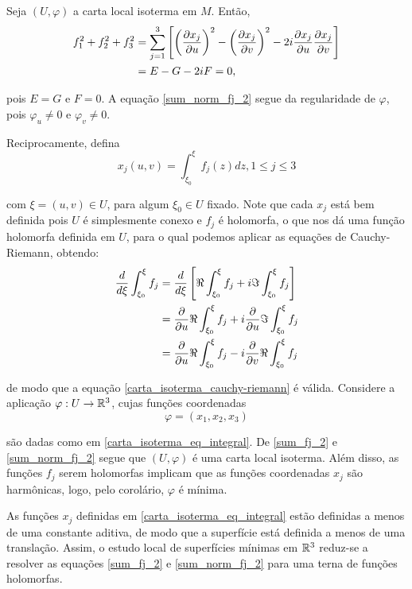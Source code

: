 \begin{demonstracao}
	Seja $(U, \varphi)$ a carta local isoterma em $M$. Então,
	\begin{align*}
	f_1^2 + f_2^2 + f_3^2 &= \sum_{j=1}^{3} \left[ \left( \frac{\partial x_j}{\partial u} \right)^2 - \left( \frac{\partial x_j}{\partial v} \right)^2 - 2i \frac{\partial x_j}{\partial u} \frac{\partial x_j}{\partial v} \right]\\
	&= E - G - 2iF = 0,
	\end{align*}
	
	pois $E=G$ e $F=0$. A equação \ref{sum_norm_fj_2} segue da regularidade de $\varphi$, pois $\varphi_u \neq 0$ e $\varphi_v \neq 0$.
	
	Reciprocamente, defina
	\begin{equation}\label{carta_isoterma_eq_integral}
	x_j(u,v) = \int_{\xi_0}^{\xi} f_j(z) dz, 1 \leq j \leq 3
	\end{equation}
	
	com $\xi = (u,v) \in U$, para algum $\xi_0 \in U$ fixado. Note que cada $x_j$ está bem definida pois $U$ é simplesmente conexo e $f_j$ é holomorfa, o que nos dá uma função holomorfa definida em $U$, para o qual podemos aplicar as equações de Cauchy-Riemann, obtendo:
	\begin{align*}
	\frac{d}{d \xi} \int_{\xi_0}^{\xi} f_j &= \frac{d}{d \xi} \left[ \Re \int_{\xi_0}^{\xi} f_j + i \Im \int_{\xi_0}^{\xi} f_j \right]\\
	&= \frac{\partial}{\partial u} \Re \int_{\xi_0}^{\xi} f_j + i \frac{\partial}{\partial u} \Im \int_{\xi_0}^{\xi} f_j\\
	&= \frac{\partial}{\partial u} \Re \int_{\xi_0}^{\xi} f_j - i \frac{\partial}{\partial v} \Re \int_{\xi_0}^{\xi} f_j
	\end{align*}
	
	de modo que a equação \ref{carta_isoterma_cauchy-riemann} é válida. Considere a aplicação $\varphi: U \rightarrow \mathbb{R}^3$, cujas funções coordenadas
	\begin{equation*}
	\varphi = (x_1,x_2,x_3)
	\end{equation*}
	
	são dadas como em \ref{carta_isoterma_eq_integral}. De \ref{sum_fj_2} e \ref{sum_norm_fj_2} segue que $(U,\varphi)$ é uma carta local isoterma. Além disso, as funções $f_j$ serem holomorfas implicam que as funções coordenadas $x_j$ são harmônicas, logo, pelo corolário, $\varphi$ é mínima.
\end{demonstracao}

\begin{observacao}
	As funções $x_j$ definidas em \ref{carta_isoterma_eq_integral} estão definidas a menos de uma constante aditiva, de modo que a superfície está definida a menos de uma translação. Assim, o estudo local de superfícies mínimas em $\mathbb{R}^3$ reduz-se a resolver as equações \ref{sum_fj_2} e \ref*{sum_norm_fj_2} para uma terna de funções holomorfas.
\end{observacao}

